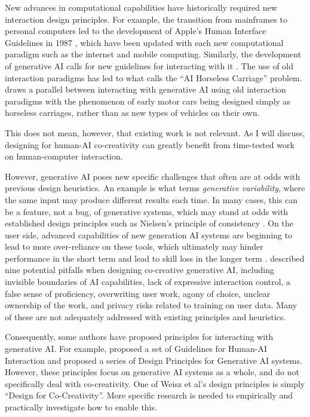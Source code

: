 New advances in computational capabilities have historically required new interaction design principles. For example, the transition from mainframes to personal computers led to the development of Apple's Human Interface Guidelines in 1987 \citep{Apple-Inc1987-am}, which have been updated with each new computational paradigm such as the internet and mobile computing. Similarly, the development of generative AI calls for new guidelines for interacting with it \citep{Weisz2024-io}. The use of old interaction paradigms has led to what \citet{Koomen2025-eu} calls the ``AI Horseless Carriage'' problem. \citeauthor{Koomen2025-eu} draws a parallel between interacting with generative AI using old interaction paradigms with the phenomenon of early motor cars being designed simply as horseless carriages, rather than as new types of vehicles on their own. 

This does not mean, however, that existing work is not relevant. As I will discuss, designing for human-AI co-creativity can greatly benefit from time-tested work on human-computer interaction. 

However, generative AI poses new specific challenges that often are at odds with previous design heuristics. An example is what \citet{Weisz2024-io} terms \textit{generative variability}, where the same input may produce different results each time. In many cases, this can be a feature, not a bug, of generative systems, which may stand at odds with established design principles such as Nielsen's principle of consistency \citep{Nielsen1994-df}. On the user side, advanced capabilities of new generation AI systems are beginning to lead to more over-reliance on these tools, which ultimately may hinder performance in the short term and lead to skill loss in the longer term \citep{Buschek2021-ks, DellAcqua2022-dy, Gerlich2025-as}. \citet{Buschek2021-ks} described nine potential pitfalls when designing co-creative generative AI, including invisible boundaries of AI capabilities, lack of expressive interaction control, a false sense of proficiency, overwriting user work, agony of choice, unclear ownership of the work, and privacy risks related to training on user data. Many of these are not adequately addressed with existing principles and heuristics.

Consequently, some authors have proposed principles for interacting with generative AI. For example, \citet{Amershi2019-wu} proposed a set of Guidelines for Human-AI Interaction and \citet{Weisz2024-io} proposed a series of Design Principles for Generative AI systems. However, these principles focus on generative AI systems as a whole, and do not specifically deal with co-creativity. One of Weisz et al's design principles is simply ``Design for Co-Creativity''. More specific research is needed to empirically and practically investigate how to enable this. 

